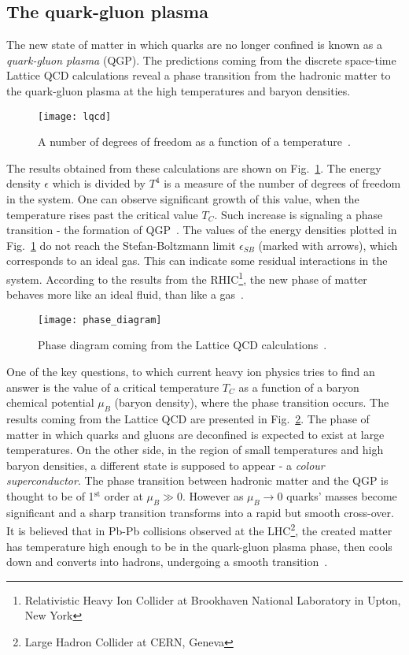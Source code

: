     \subsection{The quark-gluon plasma}
      The new state of matter in which quarks are no longer confined is known as a \textit{quark-gluon plasma} (QGP).
      The predictions coming from the discrete space-time Lattice QCD calculations reveal a phase transition from the hadronic matter to the quark-gluon plasma at the high temperatures and baryon densities.
      \begin{figure}[b]
        \centering
        \texttt{[image: lqcd]}
        \caption{A number of degrees of freedom as a function of a temperature~\cite{karsch}.}
        \label{fig:lqcd}
      \end{figure}
      The results obtained from these calculations are shown on Fig.~\ref{fig:lqcd}.
      The energy density $\epsilon$ which is divided by $T^4$ is a measure of the number of degrees of freedom in the system.
      One can observe significant growth of this value, when the temperature rises past the critical value $T_C$.
      Such increase is signaling a phase transition - the formation of QGP~\cite{drkisiel}.
      The values of the energy densities plotted in Fig.~\ref{fig:lqcd} do not reach the Stefan-Boltzmann limit $\epsilon_{SB}$ (marked with arrows), which corresponds to an ideal gas.
      This can indicate some residual interactions in the system.
      According to the results from the RHIC\footnote{Relativistic Heavy Ion Collider at Brookhaven National Laboratory in Upton, New York}, the new phase of matter behaves more like an ideal fluid, than like a gas~\cite{bartke}.
      \begin{figure}[t]
        \centering
        \texttt{[image: phase\_diagram]}
        \caption{Phase diagram coming from the Lattice QCD calculations~\cite{drkisiel}.}
        \label{fig:phase_diagram}
      \end{figure}

      One of the key questions, to which current heavy ion physics tries to find an answer is the value of a critical temperature $T_C$ as a function of a baryon chemical potential $\mu_B$ (baryon density), where the phase transition occurs.
      The results coming from the Lattice QCD are presented in Fig.~\ref{fig:phase_diagram}.
      The phase of matter in which quarks and gluons are deconfined is expected to exist at large temperatures.
      On the other side, in the region of small temperatures and high baryon densities, a different state is supposed to appear - a \textit{colour superconductor}.
      The phase transition between hadronic matter and the QGP is thought to be of 1$^\text{st}$ order at $\mu_B \gg 0$.
      However as $\mu_B \to 0$ quarks' masses become significant and a sharp transition transforms into a rapid but smooth cross-over.
      It is believed that in Pb-Pb collisions observed at the LHC\footnote{Large Hadron Collider at CERN, Geneva}, the created matter has temperature high enough to be in the quark-gluon plasma phase, then cools down and converts into hadrons, undergoing a smooth transition~\cite{drkisiel}.
